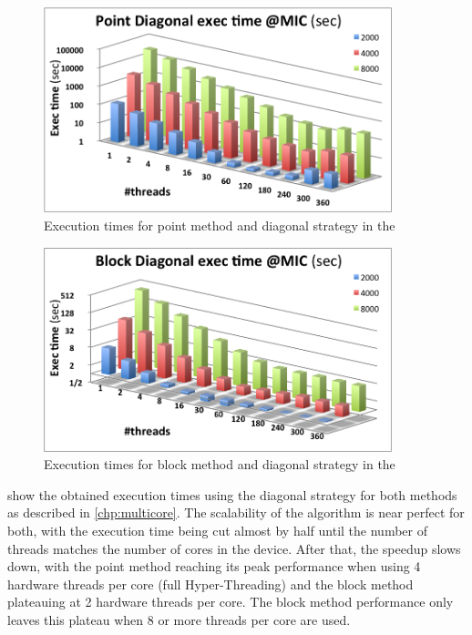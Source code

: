\documentclass[../thesis]{subfiles}
\begin{document}
	\begin{figure}[htp]
		\begin{center}
			\includegraphics[width=0.9\textwidth]{assets/images/mic/point-diagonal.png}
		\end{center}
		\caption{Execution times for point method and diagonal strategy in the \intel\xeonphi}
		\label{fig:mic:point:diagonal:times}
	\end{figure}

	\begin{figure}[htp]
		\begin{center}
			\includegraphics[width=0.9\textwidth]{assets/images/mic/block-diagonal.png}
		\end{center}
		\caption{Execution times for block method and diagonal strategy in the \intel\xeonphi}
		\label{fig:mic:block:diagonal:times}
	\end{figure}

	 show the obtained execution times using the diagonal strategy for both methods as described in \cref{chp:multicore}. The scalability of the algorithm is near perfect for both, with the execution time being cut almost by half until the number of threads matches the number of cores in the device. After that, the speedup slows down, with the point method reaching its peak performance when using 4 hardware threads per core (full Hyper-Threading) and the block method plateauing at 2 hardware threads per core. The block method performance only leaves this plateau when 8 or more threads per core are used.
\end{document}
